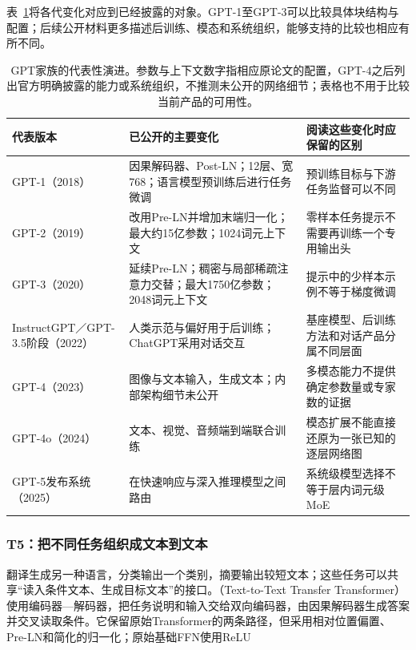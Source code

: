表~\ref{tab:transformer-gpt-generations}将各代变化对应到已经披露的对象。GPT-1至GPT-3可以比较具体块结构与配置；后续公开材料更多描述后训练、模态和系统组织，能够支持的比较也相应有所不同。

\begin{table}[p]
  \centering
  \small
  \begin{tabular}{@{}p{25mm}p{64mm}p{66mm}@{}}
    \toprule
    代表版本 & 已公开的主要变化 & 阅读这些变化时应保留的区别 \\
    \midrule
    GPT-1（2018） & 因果解码器、Post-LN；12层、宽768；语言模型预训练后进行任务微调 & 预训练目标与下游任务监督可以不同 \\
    GPT-2（2019） & 改用Pre-LN并增加末端归一化；最大约15亿参数；1024词元上下文 & 零样本任务提示不需要再训练一个专用输出头 \\
    GPT-3（2020） & 延续Pre-LN；稠密与局部稀疏注意力交替；最大1750亿参数；2048词元上下文 & 提示中的少样本示例不等于梯度微调 \\
    InstructGPT／GPT-3.5阶段（2022） & 人类示范与偏好用于后训练；ChatGPT采用对话交互 & 基座模型、后训练方法和对话产品分属不同层面 \\
    GPT-4（2023） & 图像与文本输入，生成文本；内部架构细节未公开 & 多模态能力不提供确定参数量或专家数的证据 \\
    GPT-4o（2024） & 文本、视觉、音频端到端联合训练 & 模态扩展不能直接还原为一张已知的逐层网络图 \\
    GPT-5发布系统（2025） & 在快速响应与深入推理模型之间路由 & 系统级模型选择不等于层内词元级MoE \\
    \bottomrule
  \end{tabular}
  \caption{GPT家族的代表性演进。参数与上下文数字指相应原论文的配置，GPT-4之后列出官方明确披露的能力或系统组织，不推测未公开的网络细节；表格也不用于比较当前产品的可用性。}
  \label{tab:transformer-gpt-generations}
\end{table}
\FloatBarrier

\subsubsection{T5：把不同任务组织成文本到文本}

翻译生成另一种语言，分类输出一个类别，摘要输出较短文本；这些任务可以共享“读入条件文本、生成目标文本”的接口。（Text-to-Text Transfer Transformer）使用编码器—解码器，把任务说明和输入交给双向编码器，由因果解码器生成答案并交叉读取条件。它保留原始Transformer的两条路径，但采用相对位置偏置、Pre-LN和简化的归一化；原始基础FFN使用ReLU

